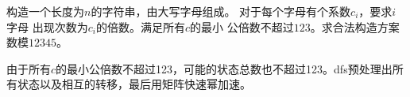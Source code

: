 \begin{prob}
	构造一个长度为$n$的字符串，由大写字母组成。
	对于每个字母有个系数$c_i$，要求$i$字母
	出现次数为$c_i$的倍数。满足所有$c$的最小
	公倍数不超过$123$。求合法构造方案数模$12345$。
\end{prob}

\begin{sol}
	由于所有$c$的最小公倍数不超过123，可能的状态总数也不超过123。dfs预处理出所有状态以及相互的转移，最后用矩阵快速幂加速。
\end{sol}
